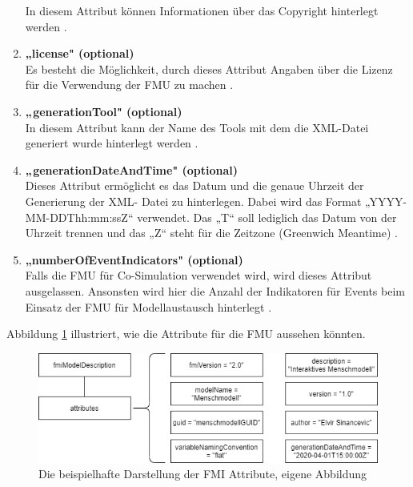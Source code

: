 \begin{enumerate}
	In diesem Attribut können Informationen über das Copyright hinterlegt werden \cite[S.33]{25}.
	\item \textbf{„license" (optional)} \cite[S.33]{25} \\
	Es besteht die Möglichkeit, durch dieses Attribut Angaben über die Lizenz für die Verwendung
	der FMU zu machen \cite[S.33]{25}.
	\item \textbf{„generationTool" (optional)} \cite[S.33]{25} \\
	In diesem Attribut kann der Name des Tools mit dem die XML-Datei generiert wurde
	hinterlegt werden \cite[S.33]{25}.
	\item \textbf{„generationDateAndTime" (optional)} \cite[S.33]{25} \\
	Dieses Attribut ermöglicht es das Datum und die genaue Uhrzeit der Generierung der XML-
	Datei zu hinterlegen. Dabei wird das Format „YYYY-MM-DDThh:mm:ssZ“ verwendet. Das
	„T“ soll lediglich das Datum von der Uhrzeit trennen und das „Z“ steht für die Zeitzone
	(Greenwich Meantime) \cite[S.33]{25}.
	\item \textbf{„numberOfEventIndicators" (optional)} \cite[S.33]{25} \\
	Falls die FMU für Co-Simulation verwendet wird, wird dieses Attribut ausgelassen. Ansonsten
	wird hier die Anzahl der Indikatoren für Events beim Einsatz der FMU für Modellaustausch
	hinterlegt \cite[S.33]{25}.
\end{enumerate}
\noindent Abbildung \ref{fig:FMUAttribute} illustriert, wie die Attribute für die FMU aussehen könnten.
\begin{figure}[h]
	\centering
	\includegraphics[width=0.9\linewidth]{Bilder/A24_FMUAttributBeispiel}
	\caption{Die beispielhafte Darstellung der FMI Attribute, eigene Abbildung}
	\label{fig:FMUAttribute}
\end{figure}
